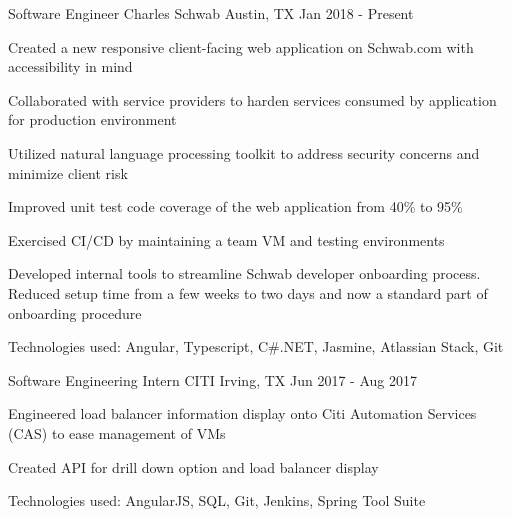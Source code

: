 

\begin{cventries}

  \cventry
    {Software Engineer} %
    {Charles Schwab} %
    {Austin, TX} %
    {Jan 2018 - Present} %
    {
      \begin{cvitems} %
        \item {Created a new responsive client-facing web application on Schwab.com with accessibility in mind}
        \item {Collaborated with service providers to harden services consumed by application for production environment}
        \item {Utilized natural language processing toolkit to address security concerns and minimize client risk}
        \item {Improved unit test code coverage of the web application from 40\% to 95\%}
        \item {Exercised CI/CD by maintaining a team VM and testing environments}
        \item {Developed internal tools to streamline Schwab developer onboarding process. Reduced setup time from a few weeks to two days and now a standard part of onboarding procedure}
        \item {Technologies used: Angular, Typescript, C\#.NET, Jasmine, Atlassian Stack, Git}
      \end{cvitems}
    }
      
  \cventry
    {Software Engineering Intern} %
    {CITI} %
    {Irving, TX} %
    {Jun 2017 - Aug 2017} %
    {
      \begin{cvitems} %
        \item {Engineered load balancer information display onto Citi Automation Services (CAS) to ease management of VMs}
        \item {Created API for drill down option and load balancer display}
        \item {Technologies used: AngularJS, SQL, Git, Jenkins, Spring Tool Suite}
      \end{cvitems}
    }


\end{cventries}
